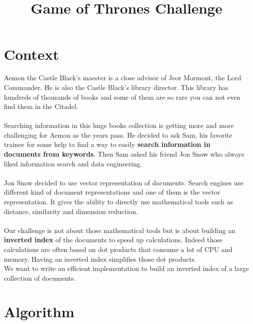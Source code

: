 \documentclass[12pt,french,titlepage]{article}
\title{\textbf{Game of Thrones Challenge}}
\date{\vspace{-35ex}}
\begin{document}
\maketitle

\section{Context}
Aemon the Castle Black's maester is a close advisor of Jeor Mormont, the Lord Commander. He is also the Castle Black's library director. This library has hundreds of thousands of books and some of them are so rare you can not even find them in the Citadel. 
\\\\
Searching information in this huge books collection is getting more and more challenging for Aemon as the years pass. He decided to ask Sam, his favorite trainee for some help to find a way to easily \textbf{search information in documents from keywords}. Then Sam asked his friend Jon Snow who always liked information search and data engineering.
\\\\
Jon Snow decided to use vector representation of documents. Search engines use different kind of document representations and one of them is the vector representation. It gives the ability to directly use mathematical tools such as distance, similarity and dimension reduction.
\\\\
Our challenge is not about those mathematical tools but is about building an \textbf{inverted index} of the documents to speed up calculations. Indeed those calculations are often based on dot products that consume a lot of CPU and memory. Having an inverted index simplifies those dot products.
\\
We want to write an efficient implementation to build an inverted index of a large collection of documents.

\section{Algorithm}
\end{document}
